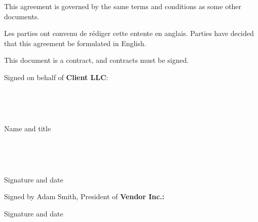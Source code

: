 {This agreement is governed by the same terms and conditions as some other documents.


Les parties ont convenu de rédiger cette entente en anglais. Parties have decided that this agreement be formulated in English.

\pagebreak


This document is a contract, and contracts must be signed.

Signed on behalf of \textbf{Client LLC}:

~

~

\hrulefill

Name and title

~

~

\hrulefill

Signature and date

Signed by Adam Smith, President of \textbf{Vendor Inc.:}

\hrulefill

Signature and date}


